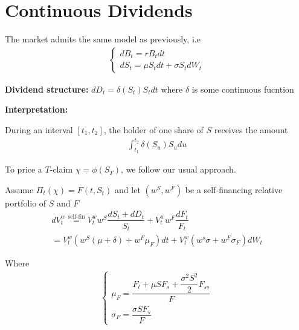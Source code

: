 \section{Continuous Dividends}\par
\noindent The market admits the same model as previously, i.e
\begin{equation*}
  \begin{gathered}
    \begin{cases}
      dB_t = rB_tdt\\
      dS_t = \mu S_tdt+\sigma S_tdW_t
    \end{cases}
  \end{gathered}
\end{equation*}\par
\noindent\textbf{Dividend structure:} $dD_t = \delta(S_t)S_tdt$ where $\delta$ is some continuous fucntion
\par\bigskip
\noindent\textbf{Interpretation:}\par
\noindent During an interval $[t_1,t_2]$, the holder of one share of $S$ receives the amount
\begin{equation*}
  \begin{gathered}
    \int_{t_1}^{t_2}\delta(S_u)S_udu
  \end{gathered}
\end{equation*}\par
\noindent To price a $T$-claim $\chi = \phi(S_T)$, we follow our usual approach. \par
\noindent Assume $\Pi_t(\chi) = F(t,S_t)$ and let $(w^S,w^F)$ be a self-financing relative portfolio of $S$ and $F$
\begin{equation*}
  \begin{gathered}
    dV_t^w\stackrel{\text{self-fin}}{=} V_t^ww^S\dfrac{dS_t+dD_t}{S_t}+V_t^ww^F\dfrac{dF_t}{F_t}\\
    = V_t^w(w^S(\mu+\delta)+w^F\mu_F)dt+V_t^w(w^s\sigma+w^F\sigma_F)dW_t
  \end{gathered}
\end{equation*}\par
\noindent Where 
\begin{equation*}
  \begin{gathered}
    \begin{cases}
      \mu_F = \dfrac{F_t+\mu SF_s+\dfrac{\sigma^2S^2}{2}F_{ss}}{F}\\
      \sigma_F = \dfrac{\sigma SF_s}{F}
    \end{cases}
  \end{gathered}
\end{equation*}\par
